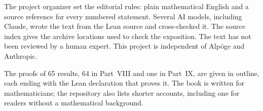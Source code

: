 The project organizer set the editorial rules: plain mathematical English and a source reference for every numbered statement. Several AI models, including Claude, wrote the text from the Lean source and cross-checked it. The source index gives the archive locations used to check the exposition. The text has not been reviewed by a human expert. This project is independent of Alpöge and Anthropic.

The proofs of 65 results, 64 in Part~VIII and one in Part~IX, are given in outline, each ending with the Lean declaration that proves it. The book is written for mathematicians; the repository also lists shorter accounts, including one for readers without a mathematical background.
